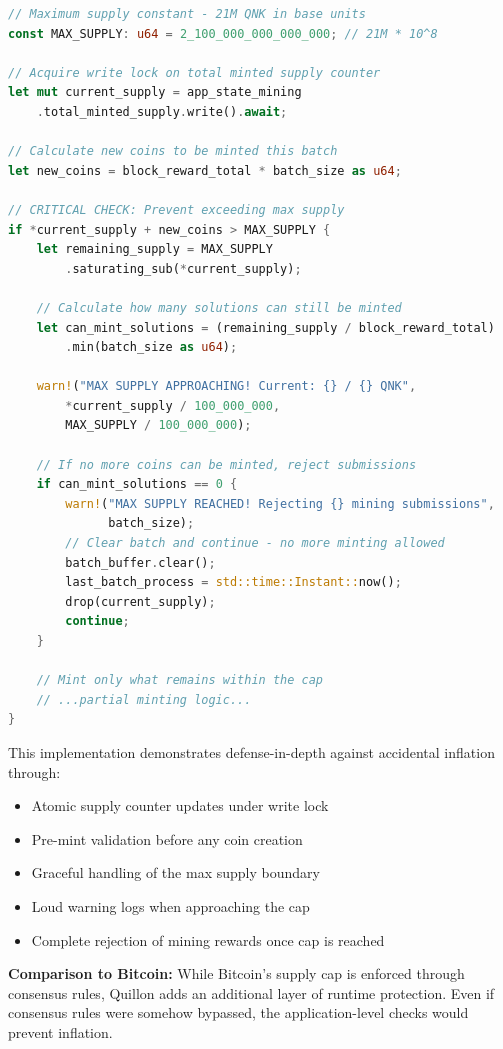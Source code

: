 \documentclass[11pt,a4paper]{article}
\begin{document}
\begin{lstlisting}[language=Rust,caption={Hard Cap Enforcement - Prevents Exceeding 21M QNK}]
// Maximum supply constant - 21M QNK in base units
const MAX_SUPPLY: u64 = 2_100_000_000_000_000; // 21M * 10^8

// Acquire write lock on total minted supply counter
let mut current_supply = app_state_mining
    .total_minted_supply.write().await;

// Calculate new coins to be minted this batch
let new_coins = block_reward_total * batch_size as u64;

// CRITICAL CHECK: Prevent exceeding max supply
if *current_supply + new_coins > MAX_SUPPLY {
    let remaining_supply = MAX_SUPPLY
        .saturating_sub(*current_supply);

    // Calculate how many solutions can still be minted
    let can_mint_solutions = (remaining_supply / block_reward_total)
        .min(batch_size as u64);

    warn!("MAX SUPPLY APPROACHING! Current: {} / {} QNK",
        *current_supply / 100_000_000,
        MAX_SUPPLY / 100_000_000);

    // If no more coins can be minted, reject submissions
    if can_mint_solutions == 0 {
        warn!("MAX SUPPLY REACHED! Rejecting {} mining submissions",
              batch_size);
        // Clear batch and continue - no more minting allowed
        batch_buffer.clear();
        last_batch_process = std::time::Instant::now();
        drop(current_supply);
        continue;
    }

    // Mint only what remains within the cap
    // ...partial minting logic...
}
\end{lstlisting}

This implementation demonstrates defense-in-depth against accidental inflation through:

\begin{itemize}[leftmargin=*]
\item Atomic supply counter updates under write lock
\item Pre-mint validation before any coin creation
\item Graceful handling of the max supply boundary
\item Loud warning logs when approaching the cap
\item Complete rejection of mining rewards once cap is reached
\end{itemize}

\textbf{Comparison to Bitcoin:} While Bitcoin's supply cap is enforced through consensus rules, Quillon adds an additional layer of runtime protection. Even if consensus rules were somehow bypassed, the application-level checks would prevent inflation.
\end{document}
